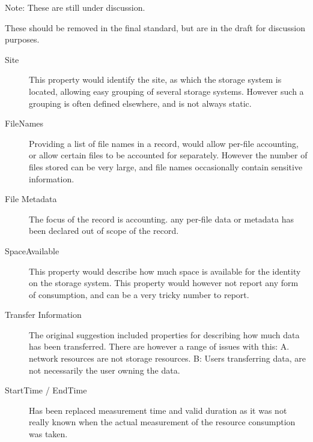 Note: These are still under discussion.

These should be removed in the final standard, but are in the draft for
discussion purposes.

\begin{description}

\item[Site] This property would identify the site, as which the storage system
is located, allowing easy grouping of several storage systems. However such a
grouping is often defined elsewhere, and is not always static.

\item[FileNames] Providing a list of file names in a record, would allow
per-file accounting, or allow certain files to be accounted for separately.
However the number of files stored can be very large, and file names occasionally
contain sensitive information.

\item[File Metadata] The focus of the record is accounting. any per-file data
or metadata has been declared out of scope of the record.

\item[SpaceAvailable] This property would describe how much space is available
for the identity on the storage system. This property would however not report
any form of consumption, and can be a very tricky number to report.

\item[Transfer Information] The original suggestion included properties for
describing how much data has been transferred. There are however a range of
issues with this: A. network resources are not storage resources. B: Users
transferring data, are not necessarily the user owning the data.

\item[StartTime / EndTime] Has been replaced measurement time and valid
duration as it was not really known when the actual measurement of the resource
consumption was taken.

\end{description}


